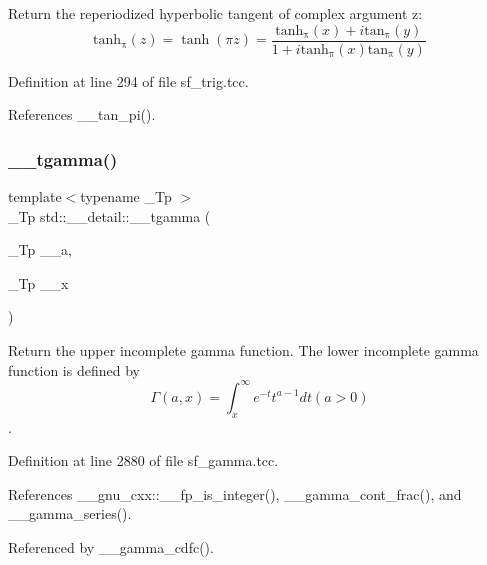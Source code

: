Return the reperiodized hyperbolic tangent of complex argument z\+: \[ \mathrm{tanh_\pi}(z) = \tanh(\pi z) = \frac{\mathrm{tanh_\pi}(x) + i \mathrm{tan_\pi}(y)} {1 + i \mathrm{tanh_\pi}(x) \mathrm{tan_\pi}(y)} \] 

Definition at line 294 of file sf\+\_\+trig.\+tcc.



References \+\_\+\+\_\+tan\+\_\+pi().

\mbox{\label{namespacestd_1_1____detail_ad2f6546e22348b07d992d522153d7d6b}} 
\subsubsection{\texorpdfstring{\+\_\+\+\_\+tgamma()}{\_\_tgamma()}}
{\footnotesize\ttfamily template$<$typename \+\_\+\+Tp $>$ \\
\+\_\+\+Tp std\+::\+\_\+\+\_\+detail\+::\+\_\+\+\_\+tgamma (\begin{DoxyParamCaption}\item[{\+\_\+\+Tp}]{\+\_\+\+\_\+a,  }\item[{\+\_\+\+Tp}]{\+\_\+\+\_\+x }\end{DoxyParamCaption})}



Return the upper incomplete gamma function. The lower incomplete gamma function is defined by \[ \Gamma(a,x) = \int_x^\infty e^{-t}t^{a-1}dt (a > 0) \]. 



Definition at line 2880 of file sf\+\_\+gamma.\+tcc.



References \+\_\+\+\_\+gnu\+\_\+cxx\+::\+\_\+\+\_\+fp\+\_\+is\+\_\+integer(), \+\_\+\+\_\+gamma\+\_\+cont\+\_\+frac(), and \+\_\+\+\_\+gamma\+\_\+series().



Referenced by \+\_\+\+\_\+gamma\+\_\+cdfc().

\mbox{\label{namespacestd_1_1____detail_ad85ad5ffdb1bab9b1e3b6fd7a114fb0d}} 
